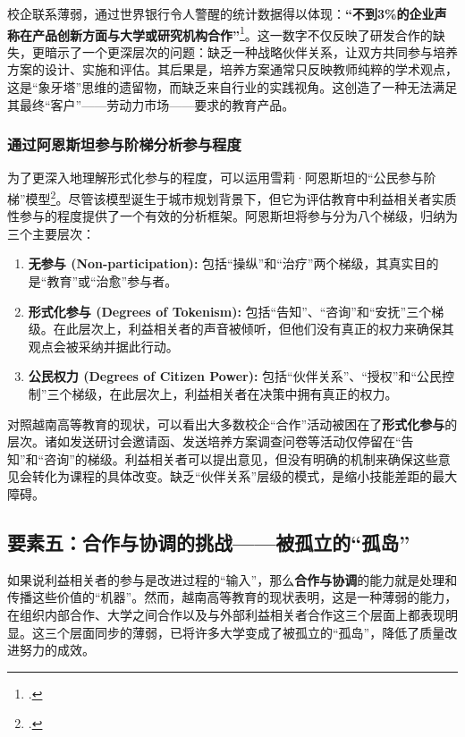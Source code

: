 校企联系薄弱，通过世界银行令人警醒的统计数据得以体现：\textbf{``不到3\%的企业声称在产品创新方面与大学或研究机构合作''}\footcite{worldbank_improvingperformance_2020}。这一数字不仅反映了研发合作的缺失，更暗示了一个更深层次的问题：缺乏一种战略伙伴关系，让双方共同参与培养方案的设计、实施和评估。其后果是，培养方案通常只反映教师纯粹的学术观点，这是``象牙塔''思维的遗留物，而缺乏来自行业的实践视角。这创造了一种无法满足其最终``客户''——劳动力市场——要求的教育产品。

\subsubsection{通过阿恩斯坦参与阶梯分析参与程度}
为了更深入地理解形式化参与的程度，可以运用雪莉·阿恩斯坦的“公民参与阶梯”模型\footcite{Arnstein1969}。尽管该模型诞生于城市规划背景下，但它为评估教育中利益相关者实质性参与的程度提供了一个有效的分析框架。阿恩斯坦将参与分为八个梯级，归纳为三个主要层次：
\begin{enumerate}
    \item \textbf{无参与 (Non-participation):} 包括“操纵”和“治疗”两个梯级，其真实目的是“教育”或“治愈”参与者。
    \item \textbf{形式化参与 (Degrees of Tokenism):} 包括“告知”、“咨询”和“安抚”三个梯级。在此层次上，利益相关者的声音被倾听，但他们没有真正的权力来确保其观点会被采纳并据此行动。
    \item \textbf{公民权力 (Degrees of Citizen Power):} 包括“伙伴关系”、“授权”和“公民控制”三个梯级，在此层次上，利益相关者在决策中拥有真正的权力。
\end{enumerate}
对照越南高等教育的现状，可以看出大多数校企“合作”活动被困在了\textbf{形式化参与}的层次。诸如发送研讨会邀请函、发送培养方案调查问卷等活动仅停留在“告知”和“咨询”的梯级。利益相关者可以提出意见，但没有明确的机制来确保这些意见会转化为课程的具体改变。缺乏“伙伴关系”层级的模式，是缩小技能差距的最大障碍。

\subsection{要素五：合作与协调的挑战——被孤立的“孤岛”}
\label{subsec:thach_thuc_hoptac}

如果说利益相关者的参与是改进过程的“输入”，那么\textbf{合作与协调}的能力就是处理和传播这些价值的“机器”。然而，越南高等教育的现状表明，这是一种薄弱的能力，在组织内部合作、大学之间合作以及与外部利益相关者合作这三个层面上都表现明显。这三个层面同步的薄弱，已将许多大学变成了被孤立的“孤岛”，降低了质量改进努力的成效。

